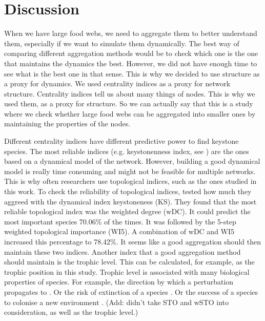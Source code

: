 \section*{Discussion}


	When we have large food webs, we need to aggregate them to better understand them, especially if we want to simulate them dynamically. The best way of comparing different aggregation methods would be to check which one is the one that maintains the dynamics the best. However, we did not have enough time to see what is the best one in that sense. This is why we decided to use structure as a proxy for dynamics. We used centrality indices as a proxy for network structure. Centrality indices tell us about many things of nodes. This is why we used them, as a proxy for structure. So we can actually say that this is a study where we check whether large food webs can be aggregated into smaller ones by maintaining the properties of the nodes.

	Different centrality indices have different predictive power to find keystone species. The most reliable indices (e.g. keystonenness index, see \citep{Libralato2006}) are the ones based on a dynamical model of the network. However, building a good dynamical model is really time consuming and might not be feasible for multiple networks.	This is why often researchers use topological indices, such as the ones studied in this work. To check the reliability of topological indices, \citet{Gouveia2020} tested how much they aggreed with the dynamical index keystoneness (KS).	They found that the most reliable topological index was the weighted degree (wDC). It could predict the most important species 70.06\% of the times. It was followed by the 5-step weighted topological importance (WI5).	A combination of wDC and WI5 increased this percentage to 78.42\%. It seems like a good aggregation should then maintain these two indices. Another index that a good aggregation method should maintain is the trophic level. This can be calculated, for example, as the trophic position in this study. Trophic level is associated with many biological properties of species. For example, the direction by which a perturbation propagates to \citep{Curtsdotter2011}.	Or the risk of extinction of a species \citep{Binzer2011}. Or the success of a species to colonise a new environment \citep{Holt2010}. (Add: \citet{Gouveia2020} didn't take STO and wSTO into consideration, as well as the trophic level.)

